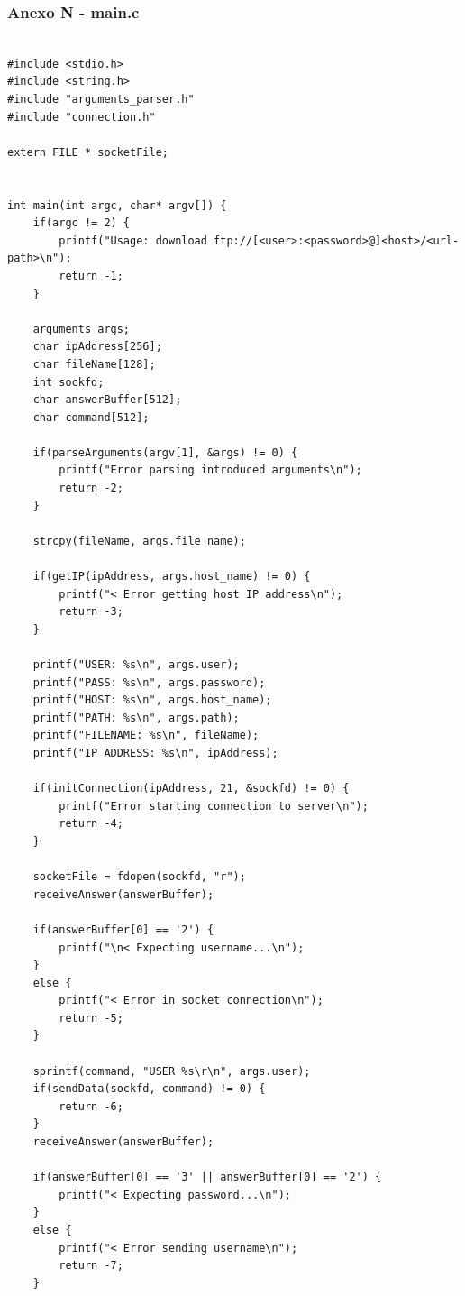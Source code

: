 \documentclass[11pt]{article}
\begin{document}
\pagebreak

\subsubsection{ Anexo N - main.c}

\begin{lstlisting}[style=CStyle]

#include <stdio.h>
#include <string.h>
#include "arguments_parser.h"
#include "connection.h"

extern FILE * socketFile;


int main(int argc, char* argv[]) {
    if(argc != 2) {
        printf("Usage: download ftp://[<user>:<password>@]<host>/<url-path>\n");
        return -1;
    }

    arguments args;
    char ipAddress[256];
    char fileName[128];
    int sockfd;
    char answerBuffer[512];
    char command[512];

    if(parseArguments(argv[1], &args) != 0) {
        printf("Error parsing introduced arguments\n");
        return -2;
    }

    strcpy(fileName, args.file_name);

    if(getIP(ipAddress, args.host_name) != 0) {
        printf("< Error getting host IP address\n");
        return -3;
    }

    printf("USER: %s\n", args.user);
    printf("PASS: %s\n", args.password);
    printf("HOST: %s\n", args.host_name);
    printf("PATH: %s\n", args.path);
    printf("FILENAME: %s\n", fileName);
    printf("IP ADDRESS: %s\n", ipAddress);

    if(initConnection(ipAddress, 21, &sockfd) != 0) {
        printf("Error starting connection to server\n");
        return -4;
    }

    socketFile = fdopen(sockfd, "r");
    receiveAnswer(answerBuffer);

    if(answerBuffer[0] == '2') {
        printf("\n< Expecting username...\n");
    }
    else {
        printf("< Error in socket connection\n");
        return -5;
    }

    sprintf(command, "USER %s\r\n", args.user);
    if(sendData(sockfd, command) != 0) {
        return -6;
    }
    receiveAnswer(answerBuffer);

    if(answerBuffer[0] == '3' || answerBuffer[0] == '2') {
        printf("< Expecting password...\n");
    }
    else {
        printf("< Error sending username\n");
        return -7;
    }


\end{lstlisting}
\end{document}
